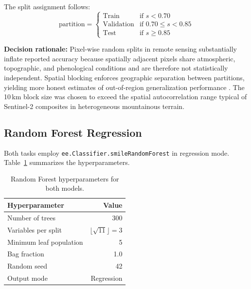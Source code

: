 \documentclass[12pt,a4paper,twoside]{article}
\begin{document}
The split assignment follows:
\begin{equation}
  \text{partition} =
  \begin{cases}
    \text{Train}      & \text{if } s < 0.70 \\
    \text{Validation} & \text{if } 0.70 \leq s < 0.85 \\
    \text{Test}       & \text{if } s \geq 0.85
  \end{cases}
  \label{eq:split_assign}
\end{equation}

\textbf{Decision rationale:} Pixel-wise random splits in remote sensing
substantially inflate reported accuracy because spatially adjacent pixels share
atmospheric, topographic, and phenological conditions and are therefore not
statistically independent.  Spatial blocking enforces geographic separation between
partitions, yielding more honest estimates of out-of-region generalization
performance \citep{Roberts2017}.  The 10\,km block size was chosen to exceed the
spatial autocorrelation range typical of Sentinel-2 composites in heterogeneous
mountainous terrain.

\subsection{Random Forest Regression}\label{sec:rf_model}

Both tasks employ \texttt{ee.Classifier.smileRandomForest} in regression mode.
Table~\ref{tab:rf_hyperparams} summarizes the hyperparameters.

\begin{table}[H]
\centering
\caption{Random Forest hyperparameters for both models.}
\label{tab:rf_hyperparams}
\begin{tabular}{@{}l r@{}}
\toprule
\textbf{Hyperparameter} & \textbf{Value} \\
\midrule
Number of trees            & 300 \\
Variables per split        & $\lfloor\sqrt{11}\rfloor = 3$ \\
Minimum leaf population    & 5 \\
Bag fraction               & 1.0 \\
Random seed                & 42 \\
Output mode                & Regression \\
\bottomrule
\end{tabular}
\end{table}
\end{document}
